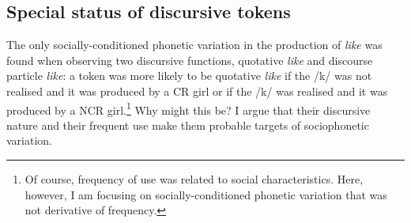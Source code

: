 







\subsection{Special status of discursive tokens}\label{sec:statusofdisc}

The only socially-conditioned phonetic variation in the production of \textit{like} was found when observing two discursive functions, quotative \textit{like} and discourse particle \textit{like}: a token was more likely to be quotative \textit{like} if the /k/ was not realised and it was produced by a CR girl or if the /k/ was realised and it was produced by a NCR girl.\footnote{Of course, frequency of use was related to social characteristics.  Here, however, I am focusing on socially-conditioned phonetic variation that was not derivative of frequency.}  Why might this be?  I argue that their discursive nature and their frequent use make them probable targets of sociophonetic variation.

